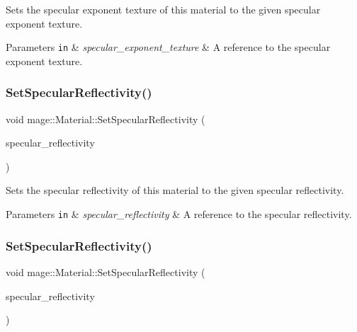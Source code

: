 Sets the specular exponent texture of this material to the given specular exponent texture.


\begin{DoxyParams}[1]{Parameters}
\mbox{\tt in}  & {\em specular\+\_\+exponent\+\_\+texture} & A reference to the specular exponent texture. \\
\hline
\end{DoxyParams}
\hypertarget{structmage_1_1_material_ac615e33c8e17149345488fed5c16dc7b}{}\label{structmage_1_1_material_ac615e33c8e17149345488fed5c16dc7b} 
\subsubsection{\texorpdfstring{Set\+Specular\+Reflectivity()}{SetSpecularReflectivity()}\hspace{0.1cm}{\footnotesize\ttfamily [1/2]}}
{\footnotesize\ttfamily void mage\+::\+Material\+::\+Set\+Specular\+Reflectivity (\begin{DoxyParamCaption}\item[{const \hyperlink{structmage_1_1_r_g_b_spectrum}{R\+G\+B\+Spectrum} \&}]{specular\+\_\+reflectivity }\end{DoxyParamCaption})\hspace{0.3cm}{\ttfamily [noexcept]}}

Sets the specular reflectivity of this material to the given specular reflectivity.


\begin{DoxyParams}[1]{Parameters}
\mbox{\tt in}  & {\em specular\+\_\+reflectivity} & A reference to the specular reflectivity. \\
\hline
\end{DoxyParams}
\hypertarget{structmage_1_1_material_ade7fe7386618bd139e9c43699eba0a20}{}\label{structmage_1_1_material_ade7fe7386618bd139e9c43699eba0a20} 
\subsubsection{\texorpdfstring{Set\+Specular\+Reflectivity()}{SetSpecularReflectivity()}\hspace{0.1cm}{\footnotesize\ttfamily [2/2]}}
{\footnotesize\ttfamily void mage\+::\+Material\+::\+Set\+Specular\+Reflectivity (\begin{DoxyParamCaption}\item[{\hyperlink{structmage_1_1_r_g_b_spectrum}{R\+G\+B\+Spectrum} \&\&}]{specular\+\_\+reflectivity }\end{DoxyParamCaption})\hspace{0.3cm}{\ttfamily [noexcept]}}

